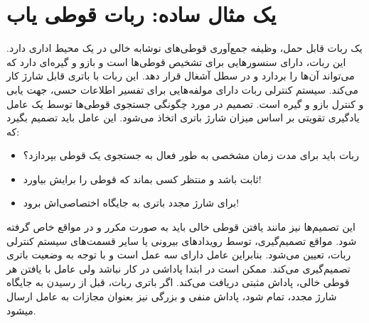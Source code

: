 \section{یک مثال ساده: ربات قوطی یاب}
یک ربات قابل حمل، وظیفه جمع‌آوری قوطی‌های نوشابه خالی در 
یک محیط اداری دارد. این ربات، دارای سنسورهایی برای تشخیص قوطی‌ها است و بازو و گیره‌ای دارد که می‌تواند آن‌ها را بردارد و در سطل آشغال قرار دهد. این ربات  با باتری قابل شارژ کار می‌کند. سیستم کنترلی ربات
دارای مولفه‌هایی برای تفسیر اطلاعات حسی، جهت یابی و کنترل بازو و گیره است. تصمیم در مورد چگونگی جستجوی قوطی‌ها توسط یک عامل یادگیری تقویتی بر اساس میزان شارژ باتری اتخاذ می‌شود. این عامل باید تصمیم بگیرد که: 
\begin{itemize}
	\item  ربات باید برای مدت زمان مشخصی به طور فعال به جستجوی  یک قوطی بپردازد؟
	\item ثابت باشد و منتظر کسی بماند که قوطی را برایش بیاورد!
	\item  برای شارژ مجدد باتری به جایگاه اختصاصی‌اش  برود!
\end{itemize}
این تصمیم‌ها نیز مانند یافتن قوطی خالی باید به صورت مکرر و در مواقع خاص گرفته شود. مواقع تصمیم‌گیری، توسط رویدادهای بیرونی یا سایر قسمت‌های سیستم کنترلی ربات، تعیین می‌شود. بنابراین عامل
دارای سه عمل است و با توجه به وضعیت باتری تصمیم‌گیری می‌کند. ممکن است در ابتدا پاداشی در کار نباشد ولی عامل با یافتن هر قوطی خالی،  پاداش مثبتی دریافت می‌کند. اگر باتری ربات، قبل از رسیدن به جایگاه شارژ مجدد، تمام شود، پاداش منفی و بزرگی نیز بعنوان مجازات به عامل ارسال می\nf شود.

